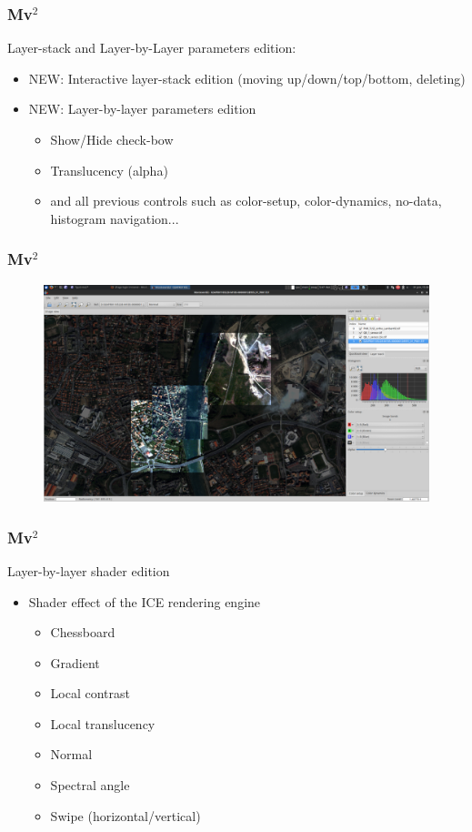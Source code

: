 \documentclass[8pt]{beamer}
\begin{document}
\begin{frame}
\frametitle{Mv$^{2}$}
 Layer-stack and Layer-by-Layer parameters edition:
\begin{itemize}
 \item NEW: Interactive layer-stack edition (moving up/down/top/bottom, deleting)
 \item NEW: Layer-by-layer parameters edition
 \begin{itemize}
  \item Show/Hide check-bow
  \item Translucency (alpha)
  \item and all previous controls such as color-setup, color-dynamics, no-data, histogram navigation...
 \end{itemize}
\end{itemize}
\end{frame}

\begin{frame}
\frametitle{Mv$^{2}$}
\begin{figure}[hbtp]
    \centering
    \includegraphics[scale=0.17]{images/2015-06-01_Multi-layer_2.png} 
\end{figure}
\end{frame}

\begin{frame}
\frametitle{Mv$^{2}$}
Layer-by-layer shader edition
\begin{itemize}
 \item Shader effect of the ICE rendering engine
 \begin{itemize}
    \item Chessboard
    \item Gradient
    \item Local contrast
    \item Local translucency
    \item Normal
    \item Spectral angle
    \item Swipe (horizontal/vertical)
 \end{itemize}
\end{itemize}
\end{frame}
\end{document}
